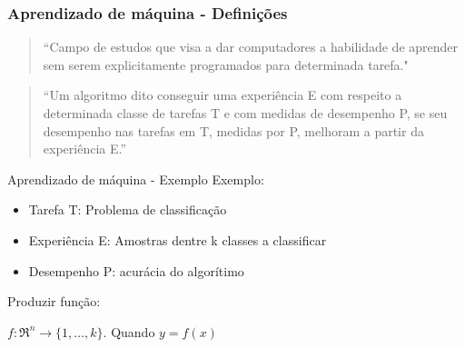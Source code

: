 \documentclass{beamer}
\begin{document}
\begin{frame}
\frametitle{Aprendizado de máquina - Definições}

\begin{quotation}
    
“Campo de estudos que visa a dar computadores a habilidade de aprender sem serem explicitamente programados para determinada tarefa." ~\cite{Samuel1959SomeSI}
\end{quotation}

\begin{quotation}
“Um algoritmo dito conseguir uma experiência E com respeito a determinada classe de tarefas T e com medidas de desempenho P, se seu desempenho nas tarefas em T, medidas por P, melhoram a partir da experiência E.” ~\cite{Mitchell97} 
\end{quotation}


\end{frame}


\begin{frame}{Aprendizado de máquina - Exemplo}
    Exemplo:  

    \begin{itemize}
        \item Tarefa T: Problema de classificação
        \item Experiência E: Amostras dentre k classes a classificar
        \item Desempenho P: acurácia do algorítimo
    \end{itemize}
    
    Produzir função:

    \(f:\Re^n\rightarrow \{1,\ldots,k\}\). Quando \( y=f(x) \)
    \end{frame}
\end{document}
